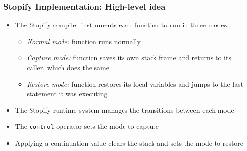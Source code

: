 \documentclass[8pt,pdf,handout]{beamer}
\begin{document}
\begin{frame}[fragile]

\frametitle{Stopify Implementation: High-level idea}

\begin{itemize}

\item The Stopify compiler instruments each function to run in three
modes:

\begin{itemize}
    \item \emph{Normal mode:} function runs normally
    \item \emph{Capture mode:} function saves its own stack frame and
    returns to its caller, which does the same
    \item \emph{Restore mode:} function restores its local
    variables and jumps to the last statement it was executing
\end{itemize}

\item The Stopify runtime system manages the transitions between each mode

\item The \lstinline|control| operator sets the mode to capture

\item Applying a continuation value clears the stack and sets the mode to restore

\end{itemize}

\end{frame}
\end{document}
